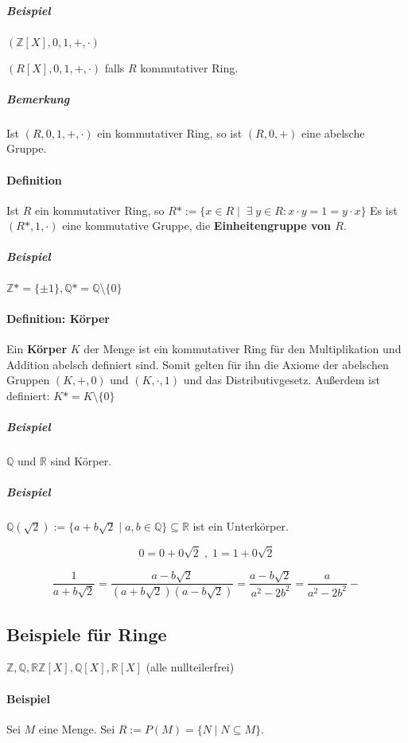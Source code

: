 \documentclass[14pt,a4paper]{article}
\newcommand{\Z}{\ensuremath{\mathbb{Z}}}
\newcommand{\Q}{\ensuremath{\mathbb{Q}}}
\begin{document}
    \subparagraph{Beispiel}
    $ ( \Z[X], 0, 1, +, \cdot )$

    $ (R[X], 0, 1, +, \cdot) $ falls $R$ kommutativer Ring.

    \subparagraph{Bemerkung}
    Ist $(R, 0, 1, +, \cdot)$ ein kommutativer Ring, so ist $(R, 0, +)$ eine
    abelsche Gruppe.

    \paragraph{Definition}
    Ist $R$ ein kommutativer Ring, so $ R* := \{ x \in R \;| \;\;\exists\; y \in R :
    x \cdot y = 1 = y \cdot x \} $
    Es ist $(R*, 1, \cdot)$ eine kommutative Gruppe, die \textbf{Einheitengruppe
      von $R$}.
    \subparagraph{Beispiel}
    $ \Z* = \{ \pm 1\}, \Q* = \Q \setminus \{ 0 \} $


    \paragraph{Definition: Körper}
    Ein \textbf{Körper} $K$ der Menge ist ein kommutativer Ring für den Multiplikation
    und Addition abelsch definiert sind.
    Somit gelten für ihn die Axiome der abelschen Gruppen $(K,+,0)$ und $(K,
    \cdot, 1)$ und das Distributivgesetz.
    Außerdem ist definiert: $K* = K \setminus \{ 0 \}$

    \subparagraph{Beispiel} $\Q$ und $\mathbb{R}$ sind Körper.

    \subparagraph{Beispiel}
    $ \Q( \sqrt{2} ) := \{ a + b \sqrt{2} \;|\; a,b \in \Q \} \subseteq
    \mathbb{R}$ ist ein Unterkörper.

    $$ 0 = 0 + 0 \sqrt{2} \;,\; 1 = 1 + 0 \sqrt{2} $$

    $$ \frac{1}{a+b\sqrt{2}} = \frac{a-b\sqrt{2}}{(a + b\sqrt{2})(a - b
      \sqrt{2})} = \frac{a - b\sqrt{2}}{a^2 - 2b^2} = \frac{a}{a^2 -
      2b^2} -  $$

  \setcounter{section}{7}
  \setcounter{subsection}{3}
  \subsection{Beispiele für Ringe}
  $\Z, \Q, \mathbb{R} \Z[X], \Q[X], \mathbb{R}[X]$ (alle nullteilerfrei)

  \paragraph{Beispiel}
  Sei $M$ eine Menge. Sei $R := P(M) = \{ N \; | \; N \subseteq M\}$.
\end{document}
